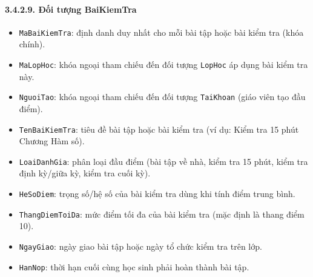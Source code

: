 \paragraph{3.4.2.9. Đối tượng BaiKiemTra}\mbox{}
\begin{itemize}\setlength{\itemsep}{2pt}\setlength{\parskip}{0pt}
    \item \texttt{MaBaiKiemTra}: định danh duy nhất cho mỗi bài tập hoặc bài kiểm tra (khóa chính).
    \item \texttt{MaLopHoc}: khóa ngoại tham chiếu đến đối tượng \texttt{LopHoc} áp dụng bài kiểm tra này.
    \item \texttt{NguoiTao}: khóa ngoại tham chiếu đến đối tượng \texttt{TaiKhoan} (giáo viên tạo đầu điểm).
    \item \texttt{TenBaiKiemTra}: tiêu đề bài tập hoặc bài kiểm tra (ví dụ: Kiểm tra 15 phút Chương Hàm số).
    \item \texttt{LoaiDanhGia}: phân loại đầu điểm (bài tập về nhà, kiểm tra 15 phút, kiểm tra định kỳ/giữa kỳ, kiểm tra cuối kỳ).
    \item \texttt{HeSoDiem}: trọng số/hệ số của bài kiểm tra dùng khi tính điểm trung bình.
    \item \texttt{ThangDiemToiDa}: mức điểm tối đa của bài kiểm tra (mặc định là thang điểm 10).
    \item \texttt{NgayGiao}: ngày giao bài tập hoặc ngày tổ chức kiểm tra trên lớp.
    \item \texttt{HanNop}: thời hạn cuối cùng học sinh phải hoàn thành bài tập.
\end{itemize}

